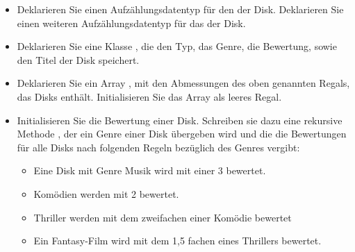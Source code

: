 \documentclass{bschlangaul-aufgabe}
\begin{document}
\begin{itemize}

%

\item Deklarieren Sie einen Aufzählungsdatentyp für den 
der Disk. Deklarieren Sie einen weiteren Aufzählungsdatentyp für das
 der Disk.

\begin{bAntwort}
\end{bAntwort}

%

\item Deklarieren Sie eine Klasse , die den Typ, das
Genre, die Bewertung, sowie den Titel der Disk speichert.

\begin{bAntwort}
\end{bAntwort}

%

\item Deklarieren Sie ein Array , mit den Abmessungen
des oben genannten Regals, das Disks enthält. Initialisieren Sie das
Array als leeres Regal.

\begin{bAntwort}
\end{bAntwort}

%

\item Initialisieren Sie die Bewertung einer Disk. Schreiben sie dazu
eine rekursive Methode , der ein Genre
einer Disk übergeben wird und die die Bewertungen für alle Disks nach
folgenden Regeln bezüglich des Genres vergibt:

\begin{itemize}
\item Eine Disk mit Genre Musik wird mit einer 3 bewertet.

\item Komödien werden mit 2 bewertet.

\item Thriller werden mit dem zweifachen einer Komödie bewertet

\item Ein Fantasy-Film wird mit dem 1,5 fachen eines Thrillers bewertet.


\end{itemize}
\end{itemize}
\end{document}
